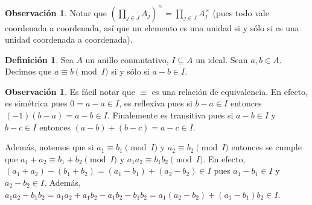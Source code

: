 \documentclass[12pt]{book}
\theoremstyle{definition}
\newtheorem{obs}[teo]{Observación}
\newtheorem{defn}[teo]{Definición}
\begin{document}
\begin{obs}
Notar que $\left( \displaystyle\prod_{j\in J} A_j\right)^\times = \displaystyle\prod_{j\in J}A_j^\times$ (pues todo vale coordenada a coordenada, así que un elemento es una unidad si y sólo si es una unidad coordenada a coordenada).
\end{obs}

\begin{defn}
Sea $A$ un anillo conmutativo, $I\subseteq A$ un ideal. Sean $a,b\in A$. Decimos que $a\equiv b\pmod{I}$ si y sólo si $a-b\in I$.
\end{defn}

\begin{obs}
Es fácil notar que $\equiv$ es una relación de equivalencia. En efecto, es simétrica pues $0 = a-a\in I$, es reflexiva pues si $b-a\in I$ entonces $(-1)(b-a) = a-b\in I$. Finalemente es transitiva pues si $a-b\in I$ y $b-c\in I$ entonces $(a-b)+(b-c) = a-c\in I$.

Además, notemos que si $a_1\equiv b_1\pmod{I}$ y $a_2\equiv b_2\pmod{I}$ entonces se cumple que $a_1+a_2 \equiv b_1+b_2\pmod{I}$ y $a_1a_2\equiv b_1b_2\pmod{I}$. En efecto, $(a_1+a_2) - (b_1+b_2) = (a_1-b_1) + (a_2-b_2)\in I$ pues $a_1-b_1\in I$ y $a_2-b_2\in I$. Además, $a_1a_2 - b_1b_2 = a_1a_2 + a_1b_2 - a_1b_2 - b_1b_2 = a_1(a_2-b_2) + (a_1-b_1)b_2 \in I$.
\end{obs}
\end{document}
